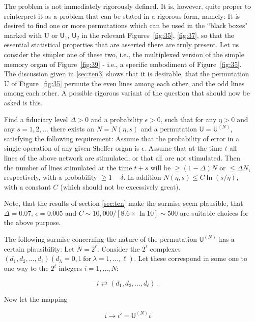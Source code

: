 \documentclass[twocolumn,preprintnumbers,amsmath,amssymb,floatfix]{revtex4}
\begin{document}
The problem is not immediately rigorously defined. It is, however,
quite proper to reinterpret it as a problem that can be stated in
a rigorous form, namely: It is desired to find one or more
permutations which can be used in the ``black boxes" marked with
\textsf{U} or $\textsf{U}_1$, $\textsf{U}_2$ in the relevant
Figures~\ref{fig:35}, \ref{fig:37}, so that the essential
statistical properties that are asserted there are truly present.
Let us consider the simpler one of these two, i.e., the
multiplexed version of the simple memory organ of
Figure~\ref{fig:39} - i.e., a specific embodiment of
Figure~\ref{fig:35}. The discussion given in \ref{sec:ten3} shows
that it is desirable, that the permutation \textsf{U} of
Figure~\ref{fig:35} permute the even lines among each other, and
the odd lines among each other. A possible rigorous variant of the
question that should now be asked is this.

Find a fiduciary level $\Delta>0$ and a probability $\epsilon>0$,
such that for any $\eta>0$ and any $s=1, 2, \ldots$ there exists
an $N=N(\eta, s)$ and a permutation $\textsf{U}=\textsf{U}^{(N)}$,
satisfying the following requirement: Assume that the probability
of error in a single operation of any given Sheffer organ is
$\epsilon$. Assume that at the time $t$ all lines of the above
network are stimulated, or that all are not stimulated. Then the
number of lines stimulated at the time $t+s$ will be
$\geq(1-\Delta)N$ or $\leq\Delta N$, respectively, with a
probability $\geq1-\delta$. In addition $N(\eta,s)\leq
C\ln{(s/\eta)}$, with a constant $C$ (which should not be
excessively great).

Note, that the results of section \ref{sec:ten} make the surmise
seem plausible, that $\Delta=0.07$, $\epsilon=0.005$ and
$C\sim10,000/[8.6\times\ln{10}]\sim 500$ are suitable choices for
the above purpose.

The following surmise concerning the nature of the permutation
$\textsf{U}^{(N)}$ has a certain plausibility: Let $N=2^\ell$.
Consider the $2^\ell$ complexes
$(d_1,d_2,\ldots,d_\ell)(d_\lambda=0,1~\mathrm{for}~
\lambda=1,\ldots,\ell)$. Let these correspond in some one to one
way to the $2^\ell$ integers $i=1,\ldots,N$:

\begin{equation}
\label{eq:28} i\rightleftarrows (d_1,d_2,\ldots,d_\ell)~.
\end{equation}

\noindent Now let the mapping

\begin{equation}
\label{eq:29} i\rightarrow i'=\textsf{U}^{(N)}i
\end{equation}
\end{document}
